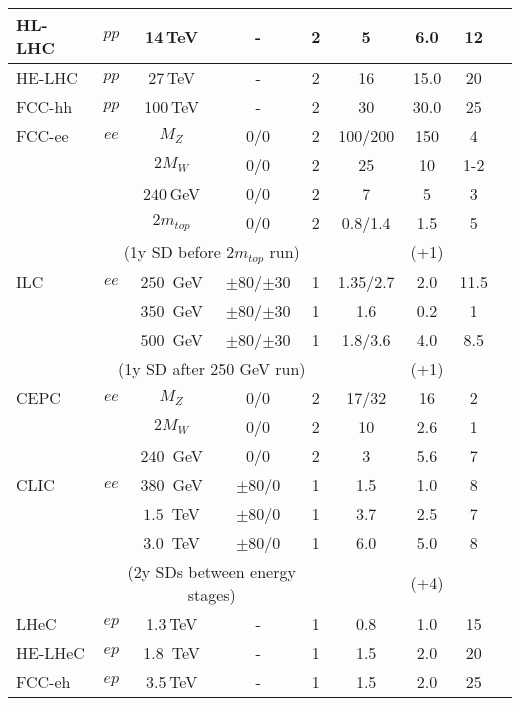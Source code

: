 \begin{table}
\begin{center}
\begin{tabular}{|l|ccccc|cc|l|}
\rule{0pt}{1.0em}%
HL-LHC & $pp$ & 14\,TeV & - & 2 & 5 & 6.0 & 12 & \cite{Cepeda:2019klc} \\\hline
HE-LHC & $pp$ & 27\,TeV & - & 2 & 16 & 15.0 & 20 & \cite{Cepeda:2019klc}  \\\hline
FCC-hh & $pp$ & 100\,TeV & - & 2 & 30 & 30.0 & 25 & \cite{Mangano:FCC2018}  \\\hline
FCC-ee & $ee$ & $M_Z$ & 0/0 & 2 & 100/200 & 150 & 4 & \cite{Mangano:FCC2018}   \\
  & & $2M_W$ & 0/0 & 2 & 25 & 10 & 1-2 & \\
  & & $240$\,GeV & 0/0 & 2 & 7 & 5 & 3 & \\
  & & $2m_{top}$ & 0/0 & 2 & 0.8/1.4 & 1.5 & 5 & \\
    &  \multicolumn{4}{c}{(1y SD before $2m_{top}$ run)} &  & (+1) & & \\\hline
  ILC & $ee$ & $250$~GeV & $\pm 80$/$\pm 30$ & 1 & 1.35/2.7 & 2.0 & 11.5 & \cite{Fujii:2017vwa} \\
  & & $350$~GeV & $\pm 80$/$\pm 30$ & 1 & 1.6 & 0.2 & 1 & \cite{Bambade:2019fyw} \\
  & & $500$~GeV & $\pm 80$/$\pm 30$ & 1 & 1.8/3.6 & 4.0 & 8.5 & \\
  &  \multicolumn{4}{c}{(1y SD after 250 GeV run)} & & (+1) & & \\\hline
   CEPC & $ee$ & $M_Z$ & 0/0 & 2 & 17/32 & 16 & 2 & \cite{CEPCStudyGroup:2018ghi} \\
  & & $2M_W$ & 0/0 & 2 & 10 & 2.6 & 1 & \\
  & & $240$~GeV & 0/0 & 2 & 3 & 5.6 & 7 &  \\\hline
    CLIC & $ee$ & $380$~GeV & $\pm 80$/$0$ & 1 & 1.5 & 1.0 & 8 & \cite{Roloff:2018dqu}  \\
  & & $1.5$~TeV & $\pm 80$/$0$ & 1 & 3.7 & 2.5 & 7 & \\
  & & $3.0$~TeV & $\pm 80$/$0$ & 1 & 6.0 & 5.0 & 8 & \\
  &  \multicolumn{4}{c}{(2y SDs between energy stages)} & & (+4) & & \\\hline
   LHeC & $ep$ & 1.3\,TeV & - & 1 & 0.8 & 1.0 & 15  & \cite{Bordry:2018gri} \\\hline
   HE-LHeC & $ep$ & 1.8 \,TeV & - & 1 & 1.5 & 2.0 & 20 &  \cite{Mangano:FCC2018} \\\hline
   FCC-eh & $ep$ & 3.5\,TeV & - & 1 & 1.5 &  2.0 & 25 & \cite{Mangano:FCC2018} \\
\hline\hline
\end{tabular}
\end{center}
\end{table}

